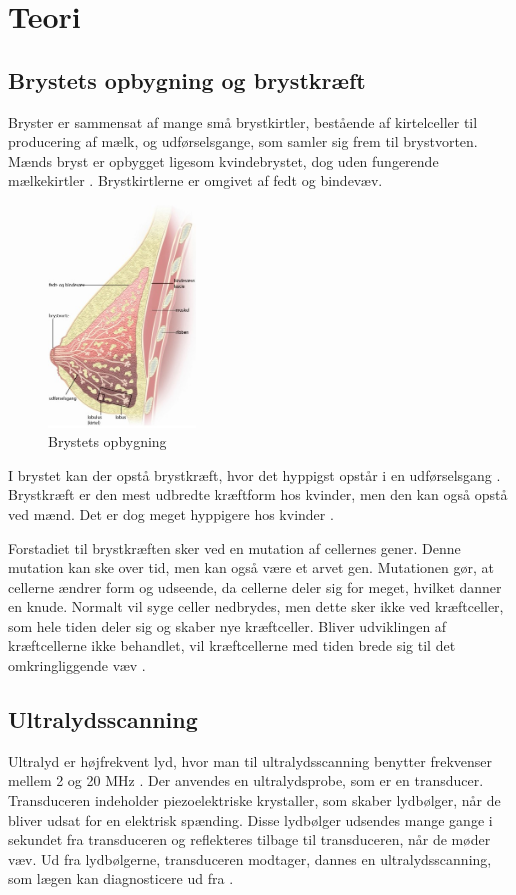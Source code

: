 \chapter{Teori}\label{Teori}

\section{Brystets opbygning og brystkræft}
Bryster er sammensat af mange små brystkirtler, bestående af kirtelceller til producering af mælk, og udførselsgange, som samler sig frem til brystvorten. Mænds bryst er opbygget ligesom kvindebrystet, dog uden fungerende mælkekirtler \cite{Mand}. Brystkirtlerne er omgivet af fedt og bindevæv\citep{Bryst}.

\begin{figure}[H]
    \centering
    \includegraphics[width=0.35\textwidth]{figurer/r/bryst}
    \caption{Brystets opbygning \citep{Bryst}}
    \label{Brystet}
\end{figure}

I brystet kan der opstå brystkræft, hvor det hyppigst opstår i en udførselsgang \citep{Bryst}. Brystkræft er den mest udbredte kræftform hos kvinder, men den kan også opstå ved mænd. Det er dog meget hyppigere hos kvinder \cite{Mand}.

Forstadiet til brystkræften sker ved en mutation af cellernes gener. Denne mutation kan ske over tid, men kan også være et arvet gen. Mutationen gør, at cellerne ændrer form og udseende, da cellerne deler sig for meget, hvilket danner en knude. Normalt vil syge celler nedbrydes, men dette sker ikke ved kræftceller, som hele tiden deler sig og skaber nye kræftceller. Bliver udviklingen af kræftcellerne ikke behandlet, vil kræftcellerne med tiden brede sig til det omkringliggende væv \cite{Udvikling}. 

\section{Ultralydsscanning}
Ultralyd er højfrekvent lyd, hvor man til ultralydsscanning benytter frekvenser mellem 2 og 20 MHz \cite{Frekvens}. Der anvendes en ultralydsprobe, som er en transducer. Transduceren indeholder piezoelektriske krystaller, som skaber lydbølger, når de bliver udsat for en elektrisk spænding. Disse lydbølger udsendes mange gange i sekundet fra transduceren og reflekteres tilbage til transduceren, når de møder væv. Ud fra lydbølgerne, transduceren modtager, dannes en ultralydsscanning, som lægen kan diagnosticere ud fra \cite{Ultralydsscanning}.

